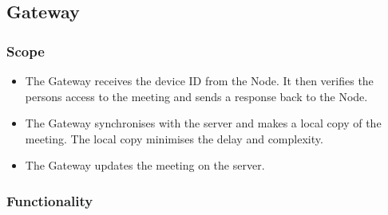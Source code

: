 \begin{comment}
    \paragraph{Funksie naam}
			\begin{description}
			    \item{\textbf{Priority}:} %
			    \item{\textbf{Service Contract}:}%
			    \item{\textbf{Pre-conditions}:}%
    			    \begin{itemize}
    			        \item %
    			        \item %
    			    \end{itemize}
			    \item{\textbf{Post-conditions}:} %
    			    \begin{itemize}
    			    \item %
    			    \item %
    			    \end{itemize}
			\end{description}
\end{comment}


\subsection{Gateway}
    \subsubsection{Scope}
        \begin{itemize}
            \item The Gateway receives the device ID from the Node. It then verifies the persons access to the meeting and sends a response back to the Node.
            \item The Gateway synchronises with the server and makes a local copy of the meeting. The local copy minimises the delay and complexity.
            \item The Gateway updates the meeting on the server.
        \end{itemize}
    \subsubsection{Functionality}
